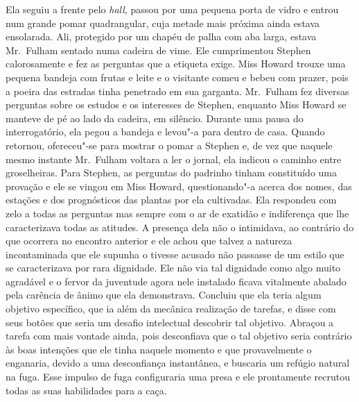 Ela seguiu a frente pelo \textit{hall}, passou por uma pequena porta
de vidro e entrou num grande pomar quadrangular, cuja metade mais
próxima ainda estava ensolarada.  Ali, protegido por um chapéu de palha
com aba larga, estava Mr.~Fulham sentado numa cadeira de vime.  Ele
cumprimentou Stephen calorosamente e fez as perguntas que a etiqueta
exige.  Miss Howard trouxe uma pequena bandeja com frutas e leite e o
visitante comeu e bebeu com prazer, pois a poeira das estradas
tinha penetrado em sua garganta.  Mr.~Fulham fez diversas perguntas
sobre os estudos e os interesses de Stephen, enquanto Miss Howard se
manteve de pé ao lado da cadeira, em silêncio.  Durante uma pausa do
interrogatório, ela pegou a bandeja e levou"-a para dentro de casa. 
Quando retornou, ofereceu"-se para mostrar o pomar a Stephen e, de vez
que naquele mesmo instante Mr.~Fulham voltara a ler o jornal, ela
indicou o caminho entre groselheiras.  Para Stephen, as perguntas do
padrinho tinham constituído uma provação e ele se vingou em Miss
Howard, questionando"-a acerca dos nomes, das estações e dos
prognósticos das plantas por ela cultivadas.  Ela respondeu com zelo a
todas as perguntas mas sempre com o ar de exatidão e indiferença que
lhe caracterizava todas as atitudes.  A presença dela não o intimidava,
ao contrário do que ocorrera no encontro anterior e ele achou que
talvez a natureza incontaminada que ele supunha o tivesse acusado não
passasse de um estilo que se caracterizava por rara dignidade.  Ele não
via tal dignidade como algo muito agradável e o fervor da juventude
agora nele instalado ficava vitalmente abalado pela carência de ânimo
que ela demonstrava.  Concluiu que ela teria algum objetivo específico,
que ia além da mecânica realização de tarefas, e disse com seus botões
que seria um desafio intelectual descobrir tal objetivo.  Abraçou a
tarefa com mais vontade ainda, pois desconfiava que o tal objetivo
seria contrário às boas intenções que ele tinha naquele momento e que
provavelmente o enganaria, devido a uma desconfiança instantânea, e
buscaria um refúgio natural na fuga.  Esse impulso de fuga configuraria
uma presa e ele prontamente recrutou todas as suas habilidades para a
caça.

